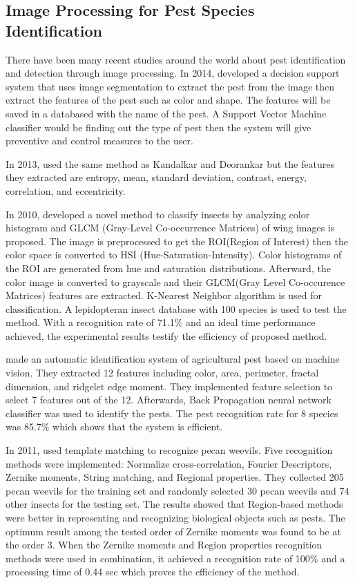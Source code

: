 \documentclass[journal]{./IEEE/IEEEtran}
\begin{document}
\subsection{Image Processing for Pest Species Identification}
There have been many recent studies around the world about pest identification and detection through image processing. In 2014, \cite{article_kandalkar} developed a decision support system that uses image segmentation to extract the pest from the image then extract the features of the pest such as color and shape. The features will be saved in a databased with the name of the pest. A Support Vector Machine classifier would be finding out the type of pest then the system will give preventive and control measures to the user.

In 2013, \cite{article_mundada} used the same method as Kandalkar and Deorankar but the features they extracted are entropy, mean, standard deviation, contrast, energy, correlation, and eccentricity.

In 2010, \cite{conf_zhu} developed a novel method to classify insects by analyzing color histogram and GLCM (Gray-Level Co-occurrence Matrices) of wing images is proposed. The image is preprocessed to get the ROI(Region of Interest) then the color space is converted to HSI (Hue-Saturation-Intensity). Color histograms of the ROI are generated from hue and saturation distributions. Afterward, the color image is converted to grayscale and their GLCM(Gray Level Co-occurence Matrices) features are extracted. K-Nearest Neighbor algorithm is used for classification. A lepidopteran insect database with 100 species is used to test the method. With a recognition rate of 71.1\% and an ideal time performance achieved, the experimental results testify the efficiency of proposed method.

\cite{article_zhang} made an automatic identification system of agricultural pest based on machine vision. They extracted 12 features including color, area, perimeter, fractal dimension, and ridgelet edge moment. They implemented feature selection to select 7 features out of the 12. Afterwards, Back Propagation neural network classifier was used to identify the pests. The pest recognition rate for 8 species was 85.7\% which shows that the system is efficient.

In 2011, \cite{article_alsaqer} used template matching to recognize pecan weevils. Five recognition methods were implemented: Normalize cross-correlation, Fourier Descriptors, Zernike moments, String matching, and Regional properties. They collected 205 pecan weevils for the training set and randomly selected 30 pecan weevils and 74 other insects for the testing set. The results showed that Region-based methods were better in representing and recognizing biological objects such as pests. The optimum result among the tested order of Zernike moments was found to be at the order 3. When the Zernike moments and Region properties recognition methods were used in combination, it achieved a recognition rate of 100\% and a processing time of 0.44 sec which proves the efficiency of the method.
\end{document}

